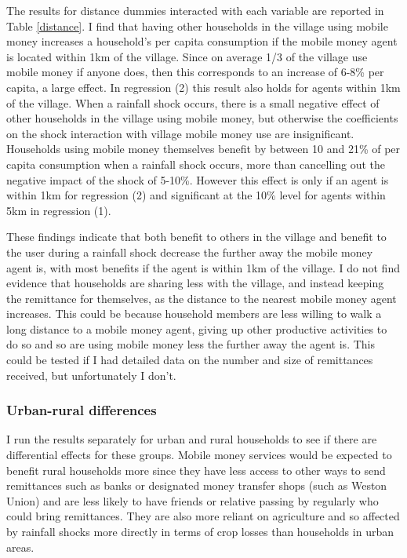 The results for distance dummies interacted with each variable are reported in Table \ref{distance}. I find that having other households in the village using mobile money increases a household's per capita consumption if the mobile money agent is located within 1km of the village. Since on average 1/3 of the village use mobile money if anyone does, then this corresponds to an increase of 6-8\% per capita, a large effect. In regression (2) this result also holds for agents within 1km of the village. When a rainfall shock occurs, there is a small negative effect of other households in the village using mobile money, but otherwise the coefficients on the shock interaction with village mobile money use are insignificant. Households using mobile money themselves benefit by between 10 and 21\% of per capita consumption when a rainfall shock occurs, more than cancelling out the negative impact of the shock of 5-10\%. However this effect is only if an agent is within 1km for regression (2) and significant at the 10\% level for agents within 5km in regression (1). 

These findings indicate that both benefit to others in the village and benefit to the user during a rainfall shock decrease the further away the mobile money agent is, with most benefits if the agent is within 1km of the village. I do not find evidence that households are sharing less with the village, and instead keeping the remittance for themselves, as the distance to the nearest mobile money agent increases. This could be because household members are less willing to walk a long distance to a mobile money agent, giving up other productive activities to do so and so are using mobile money less the further away the agent is. This could be tested if I had detailed data on the number and size of remittances received, but unfortunately I don't.   



\subsubsection{Urban-rural differences}
I run the results separately for urban and rural households to see if there are differential effects for these groups. Mobile money services would be expected to benefit rural households more since they have less access to other ways to send remittances such as banks or designated money transfer shops (such as Weston Union) and are less likely to have friends or relative passing by regularly who could bring remittances. They are also more reliant on agriculture and so affected by rainfall shocks more directly in terms of crop losses than households in urban areas. 

